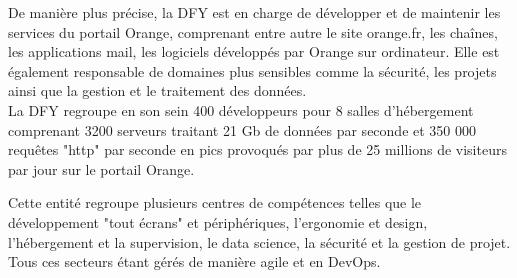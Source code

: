 De manière plus précise, la DFY est en charge de développer et de maintenir les services du portail Orange, comprenant entre autre le site orange.fr, les chaînes, les applications mail,  les logiciels développés par Orange sur ordinateur.
Elle est également responsable de domaines plus sensibles comme la sécurité, les projets ainsi que la gestion et le traitement des données.\\

La DFY regroupe en son sein 400 développeurs pour 8 salles d’hébergement comprenant 3200 serveurs traitant 21 Gb de données par seconde et 350 000 requêtes "http" par seconde en pics provoqués par plus de 25 millions de visiteurs par jour sur le portail Orange.

Cette entité regroupe plusieurs centres de compétences telles que le développement "tout écrans" et périphériques, l'ergonomie et design, l'hébergement et la supervision, le data science, la sécurité et la gestion de projet. Tous ces secteurs étant gérés de manière agile et en DevOps. 

